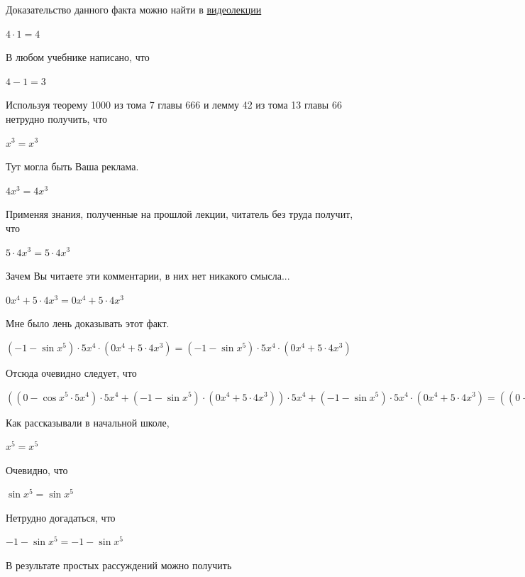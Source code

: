 \documentclass[12pt,a4paper,fleqn]{article}
\theoremstyle{definition}
\begin{document}
Доказательство данного факта можно найти в \href{https://www.youtube.com/watch?v=dQw4w9WgXcQ}{видеолекции} 

$ 4  \cdot  1  =  4 $

В любом учебнике написано, что 

$ 4  -  1  =  3 $

Используя теорему 1000 из тома 7 главы 666 и лемму 42 из тома 13 главы 66 нетрудно получить, что 

${ x }^{ 3 } = { x }^{ 3 }$

Тут могла быть Ваша реклама. 

$ 4 { x }^{ 3 } =  4 { x }^{ 3 }$

Применяя знания, полученные на прошлой лекции, читатель без труда получит, что 

$ 5  \cdot  4 { x }^{ 3 } =  5  \cdot  4 { x }^{ 3 }$

Зачем Вы читаете эти комментарии, в них нет никакого смысла... 

$ 0 { x }^{ 4 } +  5  \cdot  4 { x }^{ 3 } =  0 { x }^{ 4 } +  5  \cdot  4 { x }^{ 3 }$

Мне было лень доказывать этот факт.

$( -1  - \sin{ x }^{ 5 }) \cdot  5 { x }^{ 4 } \cdot ( 0 { x }^{ 4 } +  5  \cdot  4 { x }^{ 3 }) = ( -1  - \sin{ x }^{ 5 }) \cdot  5 { x }^{ 4 } \cdot ( 0 { x }^{ 4 } +  5  \cdot  4 { x }^{ 3 })$

Отсюда очевидно следует, что 

$(( 0  - \cos{ x }^{ 5 } \cdot  5 { x }^{ 4 }) \cdot  5 { x }^{ 4 } + ( -1  - \sin{ x }^{ 5 }) \cdot ( 0 { x }^{ 4 } +  5  \cdot  4 { x }^{ 3 })) \cdot  5 { x }^{ 4 } + ( -1  - \sin{ x }^{ 5 }) \cdot  5 { x }^{ 4 } \cdot ( 0 { x }^{ 4 } +  5  \cdot  4 { x }^{ 3 }) = (( 0  - \cos{ x }^{ 5 } \cdot  5 { x }^{ 4 }) \cdot  5 { x }^{ 4 } + ( -1  - \sin{ x }^{ 5 }) \cdot ( 0 { x }^{ 4 } +  5  \cdot  4 { x }^{ 3 })) \cdot  5 { x }^{ 4 } + ( -1  - \sin{ x }^{ 5 }) \cdot  5 { x }^{ 4 } \cdot ( 0 { x }^{ 4 } +  5  \cdot  4 { x }^{ 3 })$

Как рассказывали в начальной школе, 

${ x }^{ 5 } = { x }^{ 5 }$

Очевидно, что 

$\sin{ x }^{ 5 } = \sin{ x }^{ 5 }$

Нетрудно догадаться, что 

$ -1  - \sin{ x }^{ 5 } =  -1  - \sin{ x }^{ 5 }$

В результате простых рассуждений можно получить 
\end{document}
